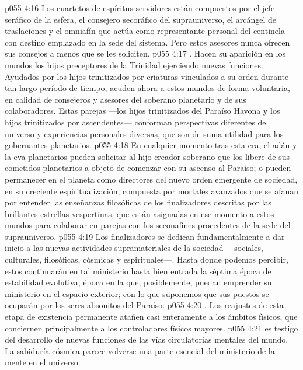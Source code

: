 \vs p055 4:16 Los cuartetos de espíritus servidores están compuestos por el jefe seráfico de la esfera, el consejero secoráfico del suprauniverso, el arcángel de traslaciones y el omniafín que actúa como representante personal del centinela con destino emplazado en la sede del sistema. Pero estos asesores nunca ofrecen sus consejos a menos que se les soliciten.
\vs p055 4:17 . Hacen su aparición en los mundos los hijos preceptores de la Trinidad ejerciendo nuevas funciones. Ayudados por los hijos trinitizados por criaturas vinculados a su orden durante tan largo período de tiempo, acuden ahora a estos mundos de forma voluntaria, en calidad de consejeros y asesores del soberano planetario y de sus colaboradores. Estas parejas ---los hijos trinitizados del Paraíso Havona y los hijos trinitizados por ascendentes--- conforman perspectivas diferentes del universo y experiencias personales diversas, que son de suma utilidad para los gobernantes planetarios.
\vs p055 4:18 En cualquier momento tras esta era, el adán y la eva planetarios pueden solicitar al hijo creador soberano que los libere de sus cometidos planetarios a objeto de comenzar con su ascenso al Paraíso; o pueden permanecer en el planeta como directores del nuevo orden emergente de sociedad, en su creciente espiritualización, compuesta por mortales avanzados que se afanan por entender las enseñanzas filosóficas de los finalizadores descritas por las brillantes estrellas vespertinas, que están asignadas en ese momento a estos mundos para colaborar en parejas con los seconafines procedentes de la sede del suprauniverso.
\vs p055 4:19 Los finalizadores se dedican fundamentalmente a dar inicio a las nuevas actividades supramateriales de la sociedad ---sociales, culturales, filosóficas, cósmicas y espirituales---. Hasta donde podemos percibir, estos continuarán en tal ministerio hasta bien entrada la séptima época de estabilidad evolutiva; época en la que, posiblemente, puedan emprender su ministerio en el espacio exterior; con lo que suponemos que sus puestos se ocuparán por los seres absonitos del Paraíso.
\vs p055 4:20 . Los reajustes de esta etapa de existencia permanente atañen casi enteramente a los ámbitos físicos, que conciernen principalmente a los controladores físicos mayores.
\vs p055 4:21  es testigo del desarrollo de nuevas funciones de las vías circulatorias mentales del mundo. La sabiduría cósmica parece volverse una parte esencial del ministerio de la mente en el universo.
